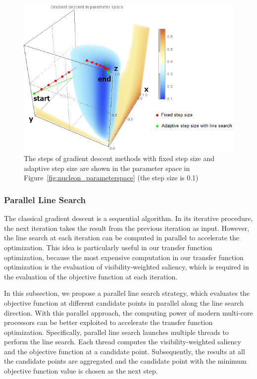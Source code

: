 \begin{figure}
	\centering
	\begin{minipage}{.9\textwidth}
		\includegraphics[width=1\linewidth]{images/nucleon_strong_red_parameterspace_path}
	\end{minipage}
	\caption{The steps of gradient descent methods with fixed step size and adaptive step size are shown in the parameter space in Figure~\ref{fig:nucleon_parameterspace} (the step size is 0.1)}
	\label{fig:nucleon_parameterspace_path}
\end{figure}

\subsubsection{Parallel Line Search}
The classical gradient descent is a sequential algorithm. In its iterative procedure, the next iteration takes the result from the previous iteration as input.
However, the line search at each iteration can be computed in parallel to accelerate the optimization. This idea is particularly useful in our transfer function optimization, because the most expensive computation in our transfer function optimization is the evaluation of visibility-weighted saliency, which is required in the evaluation of the objective function at each iteration.

In this subsection, we propose a parallel line search strategy, which evaluates the objective function at different candidate points in parallel along the line search direction. With this parallel approach, the computing power of modern multi-core processors can be better exploited to accelerate the transfer function optimization. Specifically, parallel line search launches multiple threads to perform the line search. Each thread computes the visibility-weighted saliency and the objective function at a candidate point. Subsequently, the results at all the candidate points are aggregated and the candidate point with the minimum objective function value is chosen as the next step.

